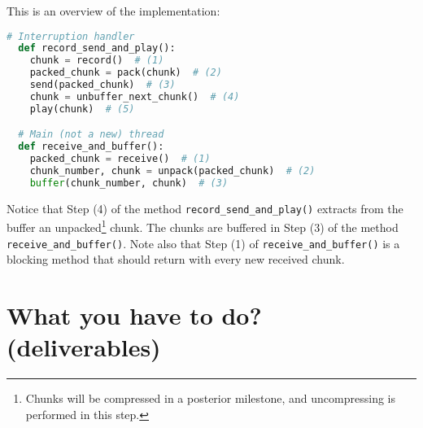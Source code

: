 This is an overview of the implementation:

\begin{lstlisting}[language=Python]
  # Interruption handler
  def record_send_and_play():
    chunk = record()  # (1)
    packed_chunk = pack(chunk)  # (2)
    send(packed_chunk)  # (3)
    chunk = unbuffer_next_chunk()  # (4)
    play(chunk)  # (5)

  # Main (not a new) thread
  def receive_and_buffer():
    packed_chunk = receive()  # (1)
    chunk_number, chunk = unpack(packed_chunk)  # (2)
    buffer(chunk_number, chunk)  # (3)
\end{lstlisting}

Notice that Step (4) of the method \verb|record_send_and_play()|
extracts from the buffer an unpacked\footnote{Chunks will be
compressed in a posterior milestone, and uncompressing is performed in
this step.} chunk. The chunks are buffered in Step (3) of the
method \verb|receive_and_buffer()|. Note also that Step (1) of
\verb|receive_and_buffer()| is a blocking method that should return with
every new received chunk.


\section{What you have to do? (deliverables)}
\label{sec:homework}


